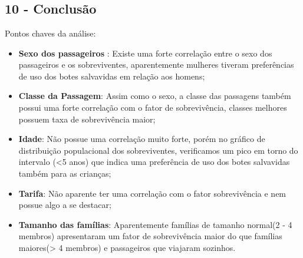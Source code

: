 \documentclass[11pt]{article}
\begin{document}
    \begin{center}
    \end{center}
    { \hspace*{\fill} \\}
    
    \begin{center}
    \end{center}
    { \hspace*{\fill} \\}
    
    \begin{center}
    \end{center}
    { \hspace*{\fill} \\}
    
    \subsection{10 - Conclusão}\label{conclusuxe3o}

Pontos chaves da análise:

\begin{itemize}
\item
  \textbf{Sexo dos passageiros} : Existe uma forte correlação entre o
  sexo dos passageiros e os sobreviventes, aparentemente mulheres
  tiveram preferências de uso dos botes salvavidas em relação aos
  homens;
\item
  \textbf{Classe da Passagem}: Assim como o sexo, a classe das passagens
  também possui uma forte correlação com o fator de sobrevivência,
  classes melhores possuem taxa de sobrevivência maior;
\item
  \textbf{Idade}: Não possue uma correlação muito forte, porém no
  gráfico de distribuição populacional dos sobreviventes, verificamos um
  pico em torno do intervalo (\textless{}5 anos) que indica uma
  preferência de uso dos botes salvavidas também para as crianças;
\item
  \textbf{Tarifa}: Não aparente ter uma correlação com o fator
  sobrevivência e nem possue algo a se destacar;
\item
  \textbf{Tamanho das famílias}: Aparentemente famílias de tamanho
  normal(2 - 4 membros) apresentaram um fator de sobrevivência maior do
  que famílias maiores(\textgreater{} 4 membros) e passageiros que
  viajaram sozinhos.
\end{itemize}
\end{document}
